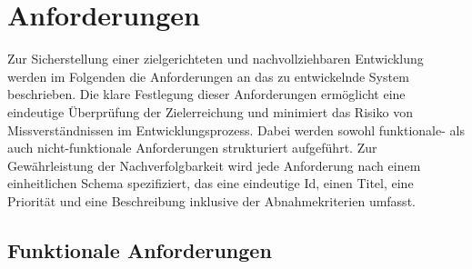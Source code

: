 \chapter{Anforderungen}\label{ch:anforderungen}

Zur Sicherstellung einer zielgerichteten und nachvollziehbaren Entwicklung werden im Folgenden die Anforderungen an das zu entwickelnde System beschrieben.
Die klare Festlegung dieser Anforderungen ermöglicht eine eindeutige Überprüfung der Zielerreichung und minimiert das Risiko von Missverständnissen im Entwicklungsprozess.
Dabei werden sowohl funktionale- als auch nicht-funktionale Anforderungen strukturiert aufgeführt.
Zur Gewährleistung der Nachverfolgbarkeit wird jede Anforderung nach einem einheitlichen Schema spezifiziert, das eine eindeutige Id, einen Titel, eine Priorität und eine Beschreibung inklusive der Abnahmekriterien umfasst.



\section{Funktionale Anforderungen}\label{sec:funktionale-anforderungen}

